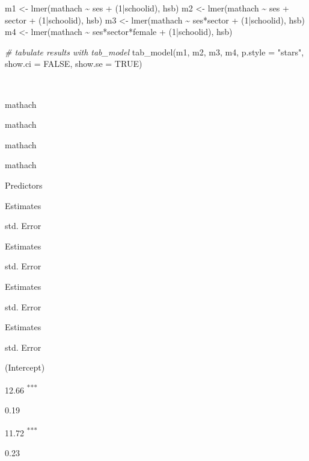 \documentclass[
  letterpaper,
  DIV=11,
  numbers=noendperiod]{scrreprt}
\newenvironment{Shaded}{\begin{snugshade}}{\end{snugshade}}
\newcommand{\AttributeTok}[1]{\textcolor[rgb]{0.49,0.56,0.16}{#1}}
\newcommand{\CommentTok}[1]{\textcolor[rgb]{0.38,0.63,0.69}{\textit{#1}}}
\newcommand{\ConstantTok}[1]{\textcolor[rgb]{0.53,0.00,0.00}{#1}}
\newcommand{\DecValTok}[1]{\textcolor[rgb]{0.25,0.63,0.44}{#1}}
\newcommand{\FunctionTok}[1]{\textcolor[rgb]{0.02,0.16,0.49}{#1}}
\newcommand{\NormalTok}[1]{\textcolor[rgb]{0.00,0.44,0.13}{#1}}
\newcommand{\OtherTok}[1]{\textcolor[rgb]{0.00,0.44,0.13}{#1}}
\newcommand{\SpecialCharTok}[1]{\textcolor[rgb]{0.25,0.44,0.63}{#1}}
\newcommand{\StringTok}[1]{\textcolor[rgb]{0.25,0.44,0.63}{#1}}
\begin{document}
\begin{Shaded}
\begin{Highlighting}[]
\NormalTok{m1 }\OtherTok{\textless{}{-}} \FunctionTok{lmer}\NormalTok{(mathach }\SpecialCharTok{\textasciitilde{}}\NormalTok{ ses }\SpecialCharTok{+}\NormalTok{ (}\DecValTok{1}\SpecialCharTok{|}\NormalTok{schoolid), hsb)}
\NormalTok{m2 }\OtherTok{\textless{}{-}} \FunctionTok{lmer}\NormalTok{(mathach }\SpecialCharTok{\textasciitilde{}}\NormalTok{ ses }\SpecialCharTok{+}\NormalTok{ sector }\SpecialCharTok{+}\NormalTok{ (}\DecValTok{1}\SpecialCharTok{|}\NormalTok{schoolid), hsb)}
\NormalTok{m3 }\OtherTok{\textless{}{-}} \FunctionTok{lmer}\NormalTok{(mathach }\SpecialCharTok{\textasciitilde{}}\NormalTok{ ses}\SpecialCharTok{*}\NormalTok{sector }\SpecialCharTok{+}\NormalTok{ (}\DecValTok{1}\SpecialCharTok{|}\NormalTok{schoolid), hsb)}
\NormalTok{m4 }\OtherTok{\textless{}{-}} \FunctionTok{lmer}\NormalTok{(mathach }\SpecialCharTok{\textasciitilde{}}\NormalTok{ ses}\SpecialCharTok{*}\NormalTok{sector}\SpecialCharTok{*}\NormalTok{female }\SpecialCharTok{+}\NormalTok{ (}\DecValTok{1}\SpecialCharTok{|}\NormalTok{schoolid), hsb)}

\CommentTok{\# tabulate results with tab\_model}
\FunctionTok{tab\_model}\NormalTok{(m1, m2, m3, m4,}
          \AttributeTok{p.style =} \StringTok{"stars"}\NormalTok{,}
          \AttributeTok{show.ci =} \ConstantTok{FALSE}\NormalTok{,}
          \AttributeTok{show.se =} \ConstantTok{TRUE}\NormalTok{)}
\end{Highlighting}
\end{Shaded}

~

mathach

mathach

mathach

mathach

Predictors

Estimates

std. Error

Estimates

std. Error

Estimates

std. Error

Estimates

std. Error

(Intercept)

12.66 \textsuperscript{***}

0.19

11.72 \textsuperscript{***}

0.23
\end{document}
